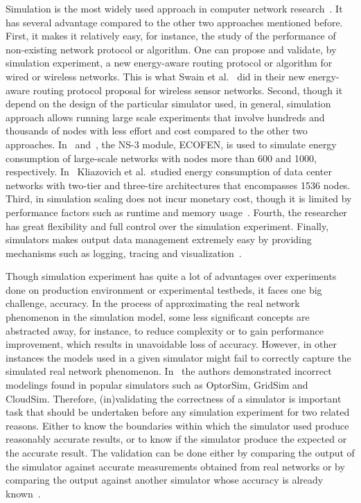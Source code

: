 Simulation is the most widely used approach in computer network research~\cite{DBLP:conf/icc/WeingartnerLW09}. It has several advantage compared to the other two approaches mentioned before. First, it makes it relatively easy, for instance, the study of the performance of non-existing network protocol or algorithm. One can propose and validate, by simulation experiment, a new energy-aware routing protocol or algorithm for wired or wireless networks. This is what Swain et al.~\cite{DBLP:conf/aina/SwainHC10} did in their new energy-aware routing protocol proposal for wireless sensor networks. Second, though it depend on the design of the particular simulator used, in general, simulation approach allows running large scale experiments that involve hundreds and thousands of nodes with less effort and cost compared to the other two approaches. In~\cite{DBLP:conf/wowmom/OrgerieLLL11} and~\cite{DBLP:conf/cloudnet/CorneaOL14}, the NS-3 module, ECOFEN, is used to simulate energy consumption of large-scale networks with nodes more than 600 and 1000, respectively. In~\cite{DBLP:journals/tjs/KliazovichBK12} Kliazovich et al.~studied energy consumption of data center networks with two-tier and three-tire architectures that encompasses 1536 nodes. Third, in simulation scaling does not incur monetary cost, though it is limited by performance factors such as runtime and memory usage~\cite{DBLP:conf/icc/WeingartnerLW09}. Fourth, the researcher has great flexibility and full control over the simulation experiment. Finally, simulators makes output data management extremely easy by providing mechanisms such as logging, tracing and visualization~\cite{ns3,DBLP:journals/jpdc/CasanovaGLQS14}.  

Though simulation experiment has quite a lot of advantages over experiments done on production environment or experimental testbeds, it faces one big challenge, accuracy. In the process of approximating the real network phenomenon in the simulation model, some less significant concepts are abstracted away, for instance, to reduce complexity or to gain performance improvement, which results in unavoidable loss of accuracy. However, in other instances the models used in a given simulator might fail to correctly capture the simulated real network phenomenon. In~\cite{DBLP:journals/tomacs/VelhoSCL13} the authors demonstrated incorrect modelings found in popular simulators such as OptorSim, GridSim and CloudSim. Therefore, (in)validating the correctness of a simulator is important task that should be undertaken before any simulation experiment for two related reasons. Either to know the boundaries within which the simulator used produce reasonably accurate results, or to know if the simulator produce the expected or the accurate result. The validation can be done either by comparing the output of the simulator against accurate measurements obtained from real networks or by comparing the output against another simulator whose accuracy is already known~\cite{DBLP:books/daglib/0076234}.
